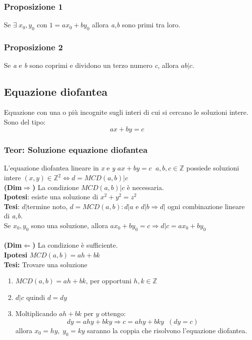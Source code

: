 \subsubsection{Proposizione 1}
Se \(\exists\; x_0,y_0\) con \(1=ax_0+by_0\) allora \textit{a,b} sono primi tra loro.

\subsubsection{Proposizione 2}
Se \textit{a} e \textit{b} sono coprimi e dividono un terzo numero \textit{c}, allora \(ab|c\).

\subsection{Equazione diofantea}
Equazione con una o più incognite sugli interi di cui si cercano le soluzioni intere. Sono del tipo:
\[ax+by=c\]

\subsubsection{Teor: Soluzione equazione diofantea}
L'equazione diofantea lineare in \textit{x} e \textit{y} \(ax+by=c\;\; a,b,c\in\mathbb{Z}\) possiede soluzioni intere \((x,y)\in\mathbb{Z}^2\Leftrightarrow d=MCD(a,b)|c\)
\\
\textbf{(Dim\(\Rightarrow\))} La condizione \(MCD(a,b)|c\) è necessaria.
\\
\textbf{Ipotesi}: esiste una soluzione di \(x^2+y^2=z^2\)
\\
\textbf{Tesi}: \(d|\)termine noto, \(d=MCD(a,b): d|a\) e \(d|b\Rightarrow d|\) ogni combinazione lineare di \textit{a,b}.
\\
Se \(x_0,y_0\) sono una soluzione, allora \(ax_0+by_0=c\Rightarrow d|c=ax_0+by_0\)
\\\\
\textbf{(Dim\(\Leftarrow\))} La condizione è sufficiente.
\\
\textbf{Ipotesi} \(MCD(a,b)=ah+bk\)
\\
\textbf{Tesi:} Trovare una soluzione
\begin{enumerate}
\item \(MCD(a,b)=ah+bk\), per opportuni \(h,k\in\mathbb{Z}\)

\item $d|c$ quindi $d=dy$

\item Moltiplicando $ah+bk$ per $y$ ottengo:
  \[dy=ahy+bky\Rightarrow c=ahy+bky\;\; (dy=c)\]
  allora $x_0=hy,\; y_0=ky$ saranno la coppia che risolvono l'equazione diofantea.

\end{enumerate}

